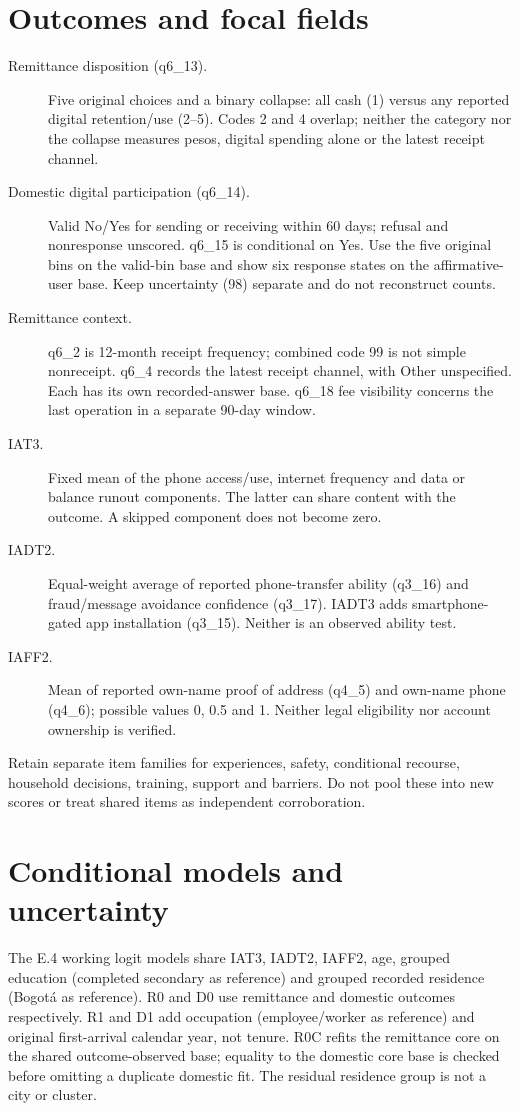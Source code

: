 \documentclass[12pt]{article}
\begin{document}
\section{Outcomes and focal fields}
\begin{description}
\item[Remittance disposition (q6\_13).] Five original choices and a binary collapse: all cash (1) versus any reported digital retention/use (2--5). Codes 2 and 4 overlap; neither the category nor the collapse measures pesos, digital spending alone or the latest receipt channel.
\item[Domestic digital participation (q6\_14).] Valid No/Yes for sending or receiving within 60 days; refusal and nonresponse unscored. q6\_15 is conditional on Yes. Use the five original bins on the valid-bin base and show six response states on the affirmative-user base. Keep uncertainty (98) separate and do not reconstruct counts.
\item[Remittance context.] q6\_2 is 12-month receipt frequency; combined code 99 is not simple nonreceipt. q6\_4 records the latest receipt channel, with Other unspecified. Each has its own recorded-answer base. q6\_18 fee visibility concerns the last operation in a separate 90-day window.
\item[IAT3.] Fixed mean of the phone access/use, internet frequency and data or balance runout components. The latter can share content with the outcome. A skipped component does not become zero.
\item[IADT2.] Equal-weight average of reported phone-transfer ability (q3\_16) and fraud/message avoidance confidence (q3\_17). IADT3 adds smartphone-gated app installation (q3\_15). Neither is an observed ability test.
\item[IAFF2.] Mean of reported own-name proof of address (q4\_5) and own-name phone (q4\_6); possible values 0, 0.5 and 1. Neither legal eligibility nor account ownership is verified.
\end{description}
Retain separate item families for experiences, safety, conditional recourse, household decisions, training, support and barriers. Do not pool these into new scores or treat shared items as independent corroboration.

\section{Conditional models and uncertainty}
The E.4 working logit models share IAT3, IADT2, IAFF2, age, grouped education (completed secondary as reference) and grouped recorded residence (Bogotá as reference). R0 and D0 use remittance and domestic outcomes respectively. R1 and D1 add occupation (employee/worker as reference) and original first-arrival calendar year, not tenure. R0C refits the remittance core on the shared outcome-observed base; equality to the domestic core base is checked before omitting a duplicate domestic fit. The residual residence group is not a city or cluster.
\end{document}
